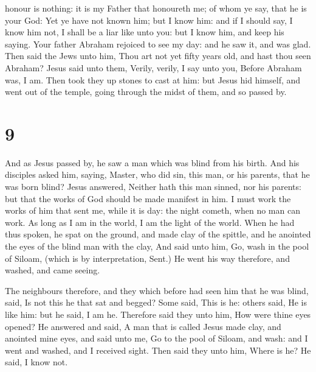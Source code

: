 honour is nothing: it is my Father that honoureth me; of whom ye say,
that he is your God:  Yet ye have not known him; but I
know him: and if I should say, I know him not, I shall be a liar like
unto you: but I know him, and keep his saying.  Your
father Abraham rejoiced to see my day: and he saw it, and was glad.
 Then said the Jews unto him, Thou art not yet fifty
years old, and hast thou seen Abraham?  Jesus said unto
them, Verily, verily, I say unto you, Before Abraham was, I am.
 Then took they up stones to cast at him: but Jesus hid
himself, and went out of the temple, going through the midst of them,
and so passed by.

\hypertarget{section-8}{%
\section{9}\label{section-8}}

 And as Jesus passed by, he saw a man which was blind from
his birth.  And his disciples asked him, saying, Master,
who did sin, this man, or his parents, that he was born blind?
 Jesus answered, Neither hath this man sinned, nor his
parents: but that the works of God should be made manifest in him.
 I must work the works of him that sent me, while it is
day: the night cometh, when no man can work.  As long as I
am in the world, I am the light of the world.  When he had
thus spoken, he spat on the ground, and made clay of the spittle, and he
anointed the eyes of the blind man with the clay,  And
said unto him, Go, wash in the pool of Siloam, (which is by
interpretation, Sent.) He went his way therefore, and washed, and came
seeing.

 The neighbours therefore, and they which before had seen
him that he was blind, said, Is not this he that sat and begged?
 Some said, This is he: others said, He is like him: but
he said, I am he.  Therefore said they unto him, How were
thine eyes opened?  He answered and said, A man that is
called Jesus made clay, and anointed mine eyes, and said unto me, Go to
the pool of Siloam, and wash: and I went and washed, and I received
sight.  Then said they unto him, Where is he? He said, I
know not.

